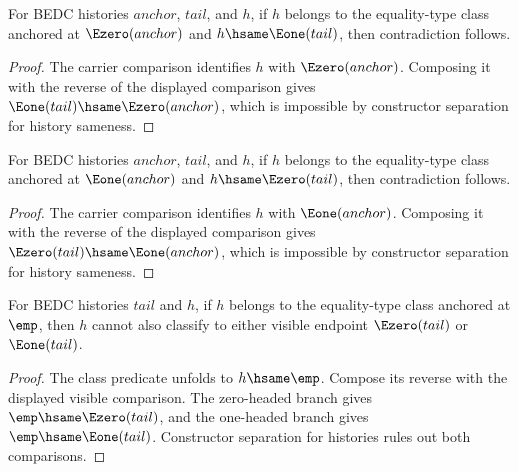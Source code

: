 \begin{theorem}
\label{thm:eqtype-class-carrier-e0-anchor-e1-tail-absurd}
For BEDC histories $anchor$, $tail$, and $h$, if $h$ belongs to the equality-type
class anchored at $\Ezero(anchor)$ and $h\hsame\Eone(tail)$, then contradiction
follows.
\end{theorem}
\begin{proof}
The carrier comparison identifies $h$ with $\Ezero(anchor)$. Composing it with
the reverse of the displayed comparison gives
$\Eone(tail)\hsame\Ezero(anchor)$, which is impossible by constructor
separation for history sameness.
\end{proof}

\begin{theorem}
\label{thm:eqtype-class-carrier-e1-anchor-e0-tail-absurd}
For BEDC histories $anchor$, $tail$, and $h$, if $h$ belongs to the equality-type
class anchored at $\Eone(anchor)$ and $h\hsame\Ezero(tail)$, then contradiction
follows.
\end{theorem}
\begin{proof}
The carrier comparison identifies $h$ with $\Eone(anchor)$. Composing it with
the reverse of the displayed comparison gives
$\Ezero(tail)\hsame\Eone(anchor)$, which is impossible by constructor
separation for history sameness.
\end{proof}

\begin{theorem}
\label{thm:eqtype-class-carrier-empty-anchor-visible-absurd}
For BEDC histories $tail$ and $h$, if $h$ belongs to the equality-type class
anchored at $\emp$, then $h$ cannot also classify to either visible endpoint
$\Ezero(tail)$ or $\Eone(tail)$.
\end{theorem}
\begin{proof}
The class predicate unfolds to $h\hsame\emp$. Compose its reverse with the
displayed visible comparison. The zero-headed branch gives
$\emp\hsame\Ezero(tail)$, and the one-headed branch gives
$\emp\hsame\Eone(tail)$. Constructor separation for histories rules out both
comparisons.
\end{proof}

